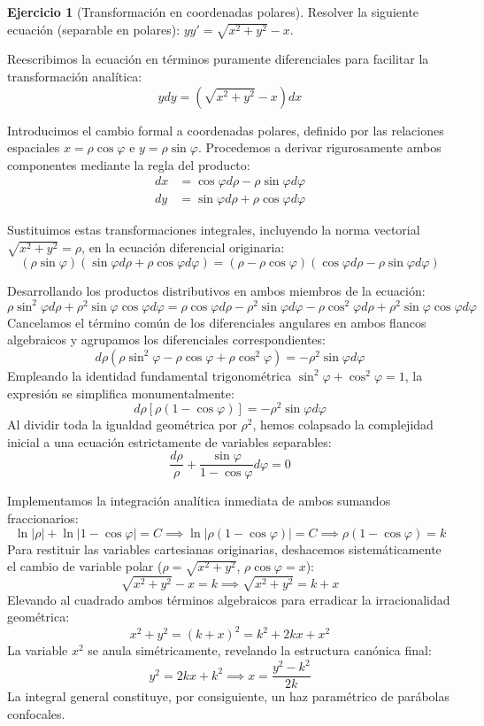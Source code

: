 \documentclass[11pt,a4paper]{article}
\theoremstyle{definition}
\newtheorem{exercise}{Ejercicio}[section]
\theoremstyle{plain}
\begin{document}
\begin{exercise}[Transformación en coordenadas polares]
Resolver la siguiente ecuación (separable en polares): $yy' = \sqrt{x^2 + y^2} - x$.
\end{exercise}

\begin{tcolorbox}
Reescribimos la ecuación en términos puramente diferenciales para facilitar la transformación analítica:
$$ y dy = (\sqrt{x^2 + y^2} - x)dx $$

Introducimos el cambio formal a coordenadas polares, definido por las relaciones espaciales $x = \rho \cos\varphi$ e $y = \rho \sin\varphi$. Procedemos a derivar rigurosamente ambos componentes mediante la regla del producto:
\begin{align*}
    dx &= \cos\varphi d\rho - \rho \sin\varphi d\varphi \\
    dy &= \sin\varphi d\rho + \rho \cos\varphi d\varphi
\end{align*}

Sustituimos estas transformaciones integrales, incluyendo la norma vectorial $\sqrt{x^2+y^2} = \rho$, en la ecuación diferencial originaria:
$$ (\rho \sin\varphi)(\sin\varphi d\rho + \rho \cos\varphi d\varphi) = (\rho - \rho \cos\varphi)(\cos\varphi d\rho - \rho \sin\varphi d\varphi) $$

Desarrollando los productos distributivos en ambos miembros de la ecuación:
$$ \rho \sin^2\varphi d\rho + \rho^2 \sin\varphi \cos\varphi d\varphi = \rho \cos\varphi d\rho - \rho^2 \sin\varphi d\varphi - \rho \cos^2\varphi d\rho + \rho^2 \sin\varphi \cos\varphi d\varphi $$
Cancelamos el término común de los diferenciales angulares en ambos flancos algebraicos y agrupamos los diferenciales correspondientes:
$$ d\rho (\rho \sin^2\varphi - \rho \cos\varphi + \rho \cos^2\varphi) = - \rho^2 \sin\varphi d\varphi $$
Empleando la identidad fundamental trigonométrica $\sin^2\varphi + \cos^2\varphi = 1$, la expresión se simplifica monumentalmente:
$$ d\rho [\rho(1 - \cos\varphi)] = - \rho^2 \sin\varphi d\varphi $$
Al dividir toda la igualdad geométrica por $\rho^2$, hemos colapsado la complejidad inicial a una ecuación estrictamente de variables separables:
$$ \frac{d\rho}{\rho} + \frac{\sin\varphi}{1 - \cos\varphi} d\varphi = 0 $$

Implementamos la integración analítica inmediata de ambos sumandos fraccionarios:
$$ \ln|\rho| + \ln|1 - \cos\varphi| = C \implies \ln|\rho(1 - \cos\varphi)| = C \implies \rho(1 - \cos\varphi) = k $$
Para restituir las variables cartesianas originarias, deshacemos sistemáticamente el cambio de variable polar ($\rho = \sqrt{x^2+y^2}$, $\rho\cos\varphi = x$):
$$ \sqrt{x^2 + y^2} - x = k \implies \sqrt{x^2 + y^2} = k + x $$
Elevando al cuadrado ambos términos algebraicos para erradicar la irracionalidad geométrica:
$$ x^2 + y^2 = (k + x)^2 = k^2 + 2kx + x^2 $$
La variable $x^2$ se anula simétricamente, revelando la estructura canónica final:
$$ y^2 = 2kx + k^2 \implies x = \frac{y^2 - k^2}{2k} $$
La integral general constituye, por consiguiente, un haz paramétrico de parábolas confocales.


\end{tcolorbox}
\end{document}
